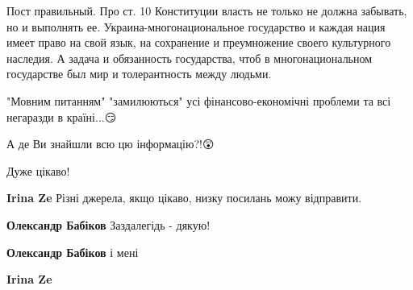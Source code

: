 \begin{itemize}
 
Пост правильный. Про ст. 10 Конституции власть не только не должна забывать, но
и выполнять ее. Украина-многонациональное государство и каждая нация имеет
право на свой язык, на сохранение и преумножение своего культурного наследия. А
задача и обязанность государства, чтоб в многонациональном государстве был мир
и толерантность между людьми.


"Мовним питанням" "замилюються" усі фінансово-економічні проблеми та всі
негаразди в країні...😏

А де Ви знайшли всю цю інформацію?!😲🧐

Дуже цікаво!🤔\Smiley[1.0][yellow]

\begin{itemize}
 
\textbf{Irina Ze} Різні джерела, якщо цікаво, низку посилань можу відправити.

 
\textbf{Олександр Бабіков}
Заздалегідь - дякую!

 
\textbf{Олександр Бабіков} і мені

 
\textbf{Irina Ze}


\end{itemize}
\end{itemize}

